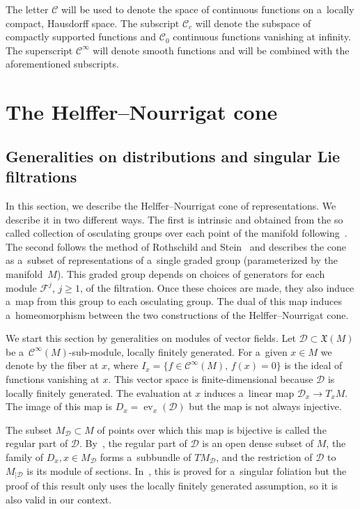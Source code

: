 \documentclass[pdftex]{sigma}
\newcommand{\CCC}{\mathscr{C}} %
\newcommand{\F}{\mathcal{F}} %
\newcommand{\ev}{\operatorname{ev}} %
\numberwithin{equation}{section}
\theoremstyle{definition}
\begin{document}
The letter $\CCC$ will be used to denote the space of continuous functions on a~locally compact, Hausdorff space. The subscript $\CCC_c$ will denote the subspace of compactly supported functions and $\CCC_0$ continuous functions vanishing at infinity. The superscript $\CCC^{\infty}$ will denote smooth functions and will be combined with the aforementioned subscripts.

\section{The Helffer--Nourrigat cone} \label{Section: Helffer--Nourrigat cone}

\subsection{Generalities on distributions and singular Lie filtrations}

In this section, we describe the Helffer--Nourrigat cone of representations. We describe it in two different ways. The first is intrinsic and obtained from the so called collection of osculating groups over each point of the manifold following~\cite{AMYMaximalHypoellipticity}. The second follows the method of Rothschild and Stein~\cite{RothschildStein} and describes the cone as a~subset of representations of a~single graded group (parameterized by the manifold~$M$). This graded group depends on choices of generators for each module $\F^j$, $j\geq 1$, of the filtration. Once these choices are made, they also induce a~map from this group to each osculating group. The dual of this map induces a~homeomorphism between the two constructions of the Helffer--Nourrigat cone.

We start this section by generalities on modules of vector fields. Let $\mathcal{D}\subset \mathfrak{X}(M)$ be a~$\CCC^{\infty}(M)$-sub-module, locally finitely generated. For a~given $x \in M$ we denote by  the fiber at $x$, where $I_x= \{ f\in \CCC^{\infty}(M),\, f(x) = 0\}$ is the ideal of functions vanishing at $x$. This vector space is finite-dimensional because $\mathcal{D}$ is locally finitely generated. The evaluation at $x$ induces a~linear map $\mathcal{D}_x \to T_xM$. The image of this map is $D_x = \ev_x(\mathcal{D})$ but the map is not always injective.

The subset $M_{\mathcal{D}} \subset M$ of points over which this map is bijective is called the regular part of $\mathcal{D}$. By~\cite[Proposition~1.5]{AndroulidakisSkandalisHolonomy}, the regular part of $\mathcal{D}$ is an open dense subset of $M$, the family of $D_x, x\in M_{\mathcal{D}}$ forms a~subbundle of $ TM_{\mathcal{D}}$, and the restriction of $\mathcal{D}$ to $M_{|\mathcal{D}}$ is its module of sections. In~\cite{AndroulidakisSkandalisHolonomy}, this is proved for a~singular foliation but the proof of this result only uses the locally finitely generated assumption, so it is also valid in our context.
\end{document}
